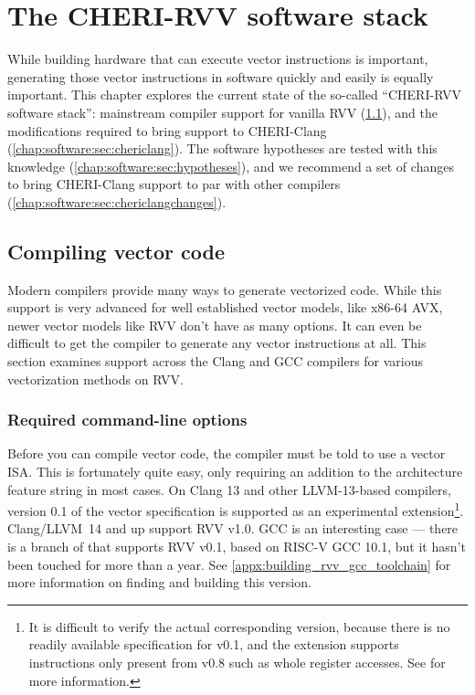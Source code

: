 \chapter{The CHERI-RVV software stack\label{chap:software}}
While building hardware that can execute vector instructions is important, generating those vector instructions in software quickly and easily is equally important.
This chapter explores the current state of the so-called ``CHERI-RVV software stack'': mainstream compiler support for vanilla RVV (\cref{chap:software:sec:compilersupport}), and the modifications required to bring support to CHERI-Clang (\cref{chap:software:sec:chericlang}).
The software hypotheses are tested with this knowledge (\cref{chap:software:sec:hypotheses}), and we recommend a set of changes to bring CHERI-Clang support to par with other compilers (\cref{chap:software:sec:chericlangchanges}).

\section{Compiling vector code}\label{chap:software:sec:compilersupport}
Modern compilers provide many ways to generate vectorized code.
While this support is very advanced for well established vector models, like x86-64 AVX, newer vector models like RVV don't have as many options.
It can even be difficult to get the compiler to generate any vector instructions at all.
This section examines support across the Clang and GCC compilers for various vectorization methods on RVV.

\subsection{Required command-line options}
Before you can compile vector code, the compiler must be told to use a vector ISA.
This is fortunately quite easy, only requiring an addition to the architecture feature string in most cases.
On Clang 13 and other LLVM-13-based compilers, version 0.1 of the vector specification is supported as an experimental extension\footnote{It is difficult to verify the actual corresponding version, because there is no readily available specification for v0.1, and the extension supports instructions only present from v0.8 such as whole register accesses. See  for more information.}.
Clang/LLVM~14 and up support RVV v1.0.
GCC is an interesting case --- there is a branch of  that supports RVV v0.1, based on RISC-V GCC 10.1, but it hasn't been touched for more than a year.
See \cref{appx:building_rvv_gcc_toolchain} for more information on finding and building this version.

